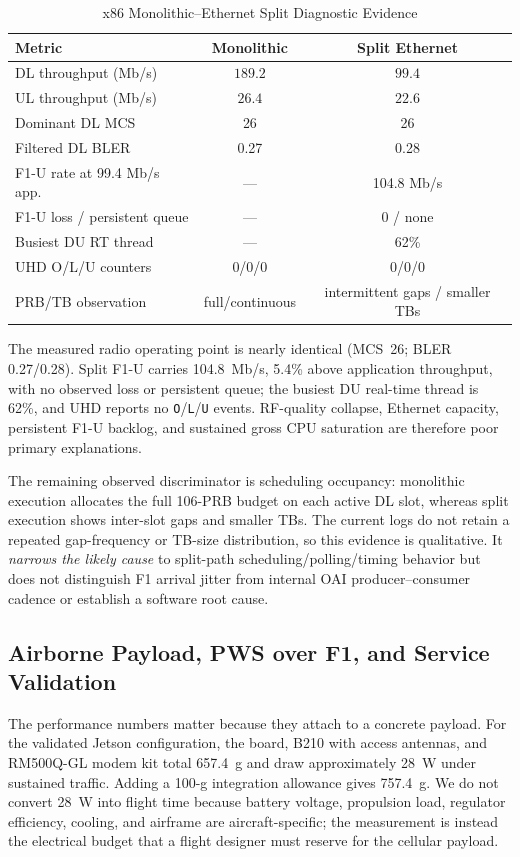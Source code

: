 \documentclass[conference]{IEEEtran}
\begin{document}
\begin{table}[t]
\caption{x86 Monolithic--Ethernet Split Diagnostic Evidence}
\label{tab:monosplit}
\centering\scriptsize
\begin{tabularx}{\columnwidth}{@{}Xcc@{}}
\toprule
\textbf{Metric} & \textbf{Monolithic} & \textbf{Split Ethernet}\\
\midrule
DL throughput (Mb/s) & $189.2$ & $99.4$\\
UL throughput (Mb/s) & $26.4$ & $22.6$\\
Dominant DL MCS & 26 & 26\\
Filtered DL BLER & 0.27 & 0.28\\
F1-U rate at 99.4 Mb/s app. & --- & 104.8 Mb/s\\
F1-U loss / persistent queue & --- & 0 / none\\
Busiest DU RT thread & --- & 62\%\\
UHD O/L/U counters & 0/0/0 & 0/0/0\\
PRB/TB observation & full/continuous & intermittent gaps / smaller TBs\\
\bottomrule
\end{tabularx}
\end{table}

The measured radio operating point is nearly identical (MCS~26; BLER
0.27/0.28). Split F1-U carries 104.8~Mb/s, 5.4\% above application throughput,
with no observed loss or persistent queue; the busiest DU real-time thread is
62\%, and UHD reports no \texttt{O}/\texttt{L}/\texttt{U} events. RF-quality
collapse, Ethernet capacity, persistent F1-U backlog, and sustained gross CPU
saturation are therefore poor primary explanations.

The remaining observed discriminator is scheduling occupancy: monolithic
execution allocates the full 106-PRB budget on each active DL slot, whereas
split execution shows
inter-slot gaps and smaller TBs. The current logs do not retain a repeated
gap-frequency or TB-size distribution, so this evidence is qualitative. It
\emph{narrows the likely cause} to split-path scheduling/polling/timing
behavior but does not distinguish F1 arrival jitter from internal OAI
producer--consumer cadence or establish a software root cause.

\subsection{Airborne Payload, PWS over F1, and Service Validation}
The performance numbers matter because they attach to a concrete payload. For
the validated Jetson configuration, the board, B210 with access antennas, and
RM500Q-GL modem kit total 657.4~g and draw approximately 28~W under sustained
traffic. Adding a 100-g integration allowance gives 757.4~g. We do not convert
28~W into flight time because battery voltage, propulsion load, regulator
efficiency, cooling, and airframe are aircraft-specific; the measurement is
instead the electrical budget that a flight designer must reserve for the
cellular payload.
\end{document}
